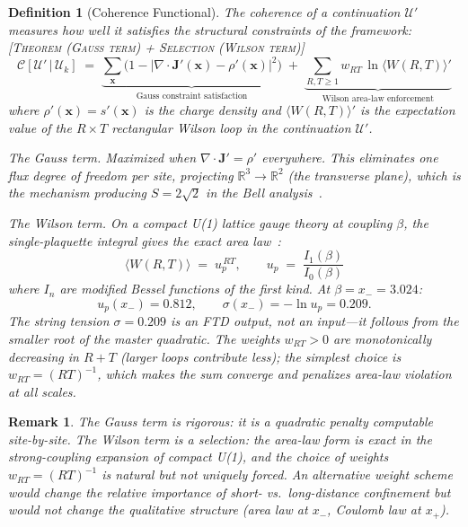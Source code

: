 \documentclass[11pt,a4paper]{article}
\newcommand{\RR}{\mathbb{R}}
\newcommand{\UU}{\mathcal{U}}
\newcommand{\etag}[1]{{\normalfont\textsc{\footnotesize [#1]}}}
\theoremstyle{compact}
\newtheorem{definition}{Definition}
\newtheorem*{remark}{Remark}
\begin{document}
\begin{definition}[Coherence Functional]
\label{def:coherence}
The \emph{coherence} of a continuation $\UU'$ measures how well it satisfies the structural constraints of the framework: \etag{Theorem (Gauss term) + Selection (Wilson term)}
\[
\mathcal{C}[\UU' \,|\, \UU_k] \;=\; \underbrace{\sum_{\mathbf{x}} \bigl(1 - |\nabla \cdot \mathbf{J}'(\mathbf{x}) - \rho'(\mathbf{x})|^2\bigr)}_{\text{Gauss constraint satisfaction}} \;+\; \underbrace{\sum_{R,T \geq 1} w_{RT}\,\ln\bigl\langle W(R,T)\bigr\rangle'}_{\text{Wilson area-law enforcement}}
\]
where $\rho'(\mathbf{x}) = s'(\mathbf{x})$ is the charge density and $\langle W(R,T)\rangle'$ is the expectation value of the $R \times T$ rectangular Wilson loop in the continuation $\UU'$.

\smallskip
\noindent\textit{The Gauss term.} Maximized when $\nabla \cdot \mathbf{J}' = \rho'$ everywhere. This eliminates one flux degree of freedom per site, projecting $\RR^3 \to \RR^2$ (the transverse plane), which is the mechanism producing $S = 2\sqrt{2}$ in the Bell analysis~\cite{lifecycle}.

\smallskip
\noindent\textit{The Wilson term.} On a compact U(1) lattice gauge theory at coupling $\beta$, the single-plaquette integral gives the exact area law~\cite{wilson_lgt}:
\[
\langle W(R,T)\rangle \;=\; u_p^{\,RT}, \qquad u_p \;=\; \frac{I_1(\beta)}{I_0(\beta)}
\]
where $I_n$ are modified Bessel functions of the first kind. At $\beta = x_- = 3.024$:
\[
u_p(x_-) = 0.812, \qquad \sigma(x_-) = -\ln u_p = 0.209.
\]
The string tension $\sigma = 0.209$ is an FTD output, not an input---it follows from the smaller root of the master quadratic. The weights $w_{RT} > 0$ are monotonically decreasing in $R + T$ (larger loops contribute less); the simplest choice is $w_{RT} = (RT)^{-1}$, which makes the sum converge and penalizes area-law violation at all scales.
\end{definition}

\begin{remark}
The Gauss term is rigorous: it is a quadratic penalty computable site-by-site. The Wilson term is a \emph{selection}: the area-law form is exact in the strong-coupling expansion of compact U(1), and the choice of weights $w_{RT} = (RT)^{-1}$ is natural but not uniquely forced. An alternative weight scheme would change the relative importance of short- vs.\ long-distance confinement but would not change the qualitative structure (area law at $x_-$, Coulomb law at $x_+$).
\end{remark}
\end{document}
